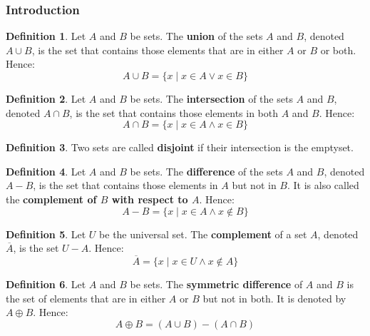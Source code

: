\documentclass[article, 11pt]{article}
\theoremstyle{definition}
\newtheorem{definition}{Definition}[subsubsection]
\newcommand{\xor}{\oplus} %
\newcommand{\unite}{\cup}
\newcommand{\inter}{\cap}
\begin{document}
    \subsubsection{Introduction}
    \begin{definition}
        Let $A$ and $B$ be sets. The \textbf{union} of the sets $A$ and $B$, denoted $A \unite B$, is the set that contains those elements that are in either $A$ or $B$ or both. Hence:
        \begin{equation*}
            A \unite B = \{x \mid x \in A \lor x \in B\}
        \end{equation*}
    \end{definition}
    \begin{definition}
        Let $A$ and $B$ be sets. The \textbf{intersection} of the sets $A$ and $B$, denoted $A \inter B$, is the set that contains those elements in both $A$ and $B$. Hence:
        \begin{equation*}
            A \inter B = \{x \mid x \in A \land x \in B\}
        \end{equation*}
    \end{definition}
    \begin{definition}
        Two sets are called \textbf{disjoint} if their intersection is the emptyset.
    \end{definition}
    \begin{definition}
        Let $A$ and $B$ be sets. The \textbf{difference} of the sets $A$ and $B$, denoted $A - B$, is the set that contains those elements in $A$ but not in $B$. It is also called the \textbf{complement of $B$ with respect to $A$}. Hence:
        \begin{equation*}
            A - B = \{x \mid x \in A \land x \not\in B\}
        \end{equation*}
    \end{definition}
    \begin{definition}
        Let $U$ be the universal set. The \textbf{complement} of a set $A$, denoted $\overline{A}$, is the set $U - A$. Hence:
        \begin{equation*}
            \overline{A} = \{x \mid x \in U \land x \not\in A\}
        \end{equation*}
    \end{definition}
    \begin{definition}
        Let $A$ and $B$ be sets. The \textbf{symmetric difference} of $A$ and $B$ is the set of elements that are in either $A$ or $B$ but not in both. It is denoted by $A \xor B$. Hence:
        \begin{equation*}
            A \xor B = (A \unite B) - (A \inter B)
        \end{equation*} 
    \end{definition}
\end{document}
